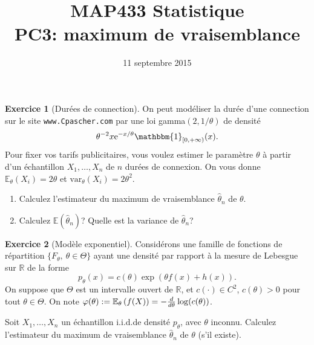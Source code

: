 \documentclass[a4paper,11pt,fleqn]{article}
\title{{\bf MAP433 Statistique}\\
{\bf PC3: maximum de vraisemblance}}
\date{11 septembre 2015}
\def\1{\mathbbm{1}}
\def\rme{\mathrm{e}}
\newcommand{\R}{\ensuremath{\mathbb{R}}}
\newcommand{\E}{\ensuremath{\mathbb{E}}}
\newcommand{\pa}[1]{\left(#1\right)}
\theoremstyle{definition}
\newtheorem{exercice}{Exercice}
\newcommand{\coint}[1]{\left[#1\right)}
\begin{document}
\maketitle

\begin{exercice}[Dur\'ees de connection]
On peut mod\'eliser la dur\'ee d'une connection sur le site {\tt www.Cpascher.com} par une loi gamma$(2,1/\theta)$ de densit\'e
$$\theta^{-2} x \rme^{-x/\theta } \1_{\coint{0,+\infty}}(x).$$
Pour fixer vos tarifs publicitaires, vous voulez estimer le
param\`etre $\theta$ \`a partir
 d'un \'echantillon $X_1,\ldots,X_n$  de $n$ dur\'ees de connexion. On vous
 donne $\E_{\theta}(X_{i})=2\theta$ et $\textrm{var}_{\theta}(X_{i})=2\theta^2$.
\begin{enumerate}
\item  Calculez l'estimateur du maximum de vraisemblance $\hat \theta_n$ de $\theta$.
\item  Calculez $\E(\hat \theta_n)$?  Quelle est la variance de $\hat \theta_n$?
\end{enumerate}
\end{exercice}

\begin{exercice}[Mod\`ele exponentiel]
Consid\'erons une famille de fonctions de r\'epartition $\{F_{\theta},\ \theta\in\Theta\}$ ayant une
densit\'e par rapport \`a la mesure de Lebesgue sur $\R$
de la forme
$$p_{\theta}(x)=c(\theta)\exp\pa{\theta f(x)+h(x)}.$$
On suppose que $\Theta$ est un intervalle ouvert de $\R$, et $c(\cdot)\in C^2$,
$c(\theta)>0$ pour tout $\theta\in \Theta$. On note
$\varphi(\theta):=\E_{\theta}\pa{f(X)}=-{d\over
d\theta}\log(c(\theta))$.

Soit $X_{1},\ldots,X_{n}$ un \'echantillon i.i.d.\;de densit\'e $p_{\theta}$, avec $\theta$ inconnu.
 Calculez l'estimateur du maximum de vraisemblance $\hat \theta_n$ de $\theta$ (s'il existe).
\end{exercice}
\end{document}
